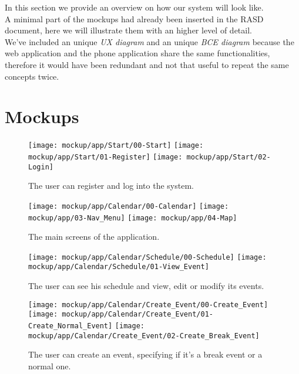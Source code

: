 In this section we provide an overview on how our system will look like.\\
A minimal part of the mockups had already been inserted in the RASD document, here we will illustrate them with an higher level of detail.\\
We've included an unique \textit{UX diagram} and an unique \textit{BCE diagram} because the web application and the phone application share the same functionalities, therefore it would have been redundant and not that useful to repeat the same concepts twice.


\section{Mockups}
\label{subsect:Mockups}
	\begin{figure}[H]
		\texttt{[image: mockup/app/Start/00-Start]}
		\hspace{.3cm}
		\texttt{[image: mockup/app/Start/01-Register]}
		\hspace{.3cm}
		\texttt{[image: mockup/app/Start/02-Login]}
		\centering
		\caption{The user can register and log into the system.}
	\end{figure}
	
	\begin{figure}[H]
		\texttt{[image: mockup/app/Calendar/00-Calendar]}
		\hspace{.3cm}
		\texttt{[image: mockup/app/03-Nav\_Menu]}
		\hspace{.3cm}
		\texttt{[image: mockup/app/04-Map]}
		\centering
		\caption{The main screens of the application.}
	\end{figure}

	\begin{figure}[H]
		\texttt{[image: mockup/app/Calendar/Schedule/00-Schedule]}
		\hspace{.3cm}
		\texttt{[image: mockup/app/Calendar/Schedule/01-View\_Event]}
		\centering 
		\caption{The user can see his schedule and view, edit or modify its events.}
	\end{figure}
	
	\begin{figure}[H]
		\texttt{[image: mockup/app/Calendar/Create\_Event/00-Create\_Event]}
		\hspace{.3cm}
		\texttt{[image: mockup/app/Calendar/Create\_Event/01-Create\_Normal\_Event]}
		\hspace{.3cm}
		\texttt{[image: mockup/app/Calendar/Create\_Event/02-Create\_Break\_Event]}
		\centering 
		\caption{The user can create an event, specifying if it's a break event or a normal one.}
	\end{figure}
	
